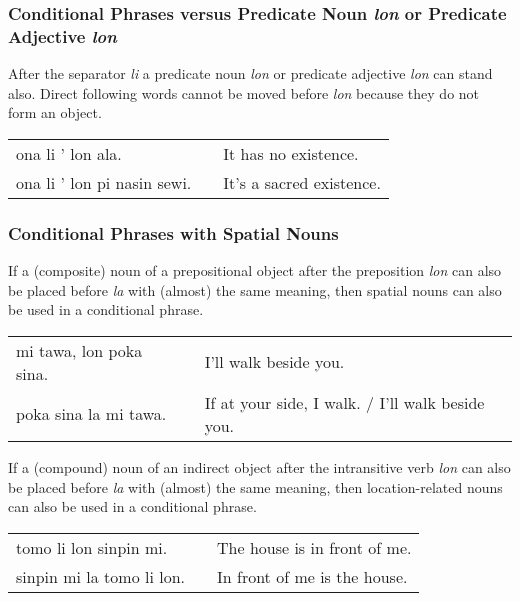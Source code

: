\subsubsection*{Conditional Phrases versus Predicate Noun \textit{lon} or Predicate Adjective \textit{lon} }
%
%

After the separator \textit{li} a predicate noun \textit{lon} or predicate adjective \textit{lon} can stand also. 
Direct following words cannot be moved before \textit{lon} because they do not form an object. 

\begin{supertabular}{p{5,5cm}|ll}
ona li ' lon ala. &&  It has no existence. \\
ona li ' lon pi nasin sewi. && It's a sacred existence. \\
\end{supertabular}

%
%
\subsubsection*{Conditional Phrases with Spatial Nouns}
%
%

If a (composite) noun of a prepositional object after the preposition \textit{lon} can also be placed before \textit{la} with (almost) the same meaning, then spatial nouns can also be used in a conditional phrase. 

\begin{supertabular}{p{5,5cm}|ll}
mi tawa, lon poka sina.  && I'll walk beside you. \\
poka sina la mi tawa.    && If at your side, I walk. / I'll walk beside you.  \\
\end{supertabular} 

If a (compound) noun of an indirect object after the intransitive verb \textit{lon} can also be placed before \textit{la} with (almost) the same meaning, then location-related nouns can also be used in a conditional phrase. 

\begin{supertabular}{p{5,5cm}|ll}
tomo li lon sinpin mi.    && The house is in front of me. \\
sinpin mi la tomo li lon. && In front of me is the house. \\
\end{supertabular}

